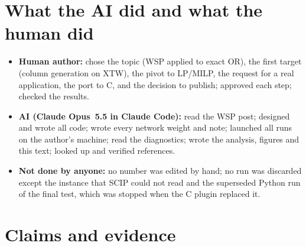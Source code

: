 \documentclass[11pt]{article}
\begin{document}
\section{What the AI did and what the human did}
\label{app:ai}
\begin{itemize}
\item \textbf{Human author:} chose the topic (WSP applied to exact OR), the first target (column
generation on XTW), the pivot to LP/MILP, the request for a real application, the port to C, and
the decision to publish; approved each step; checked the results.
\item \textbf{AI (Claude Opus~5.5 in Claude Code):} read the WSP post; designed and wrote all code;
wrote every network weight and note; launched all runs on the author's machine; read the
diagnostics; wrote the analysis, figures and this text; looked up and verified references.
\item \textbf{Not done by anyone:} no number was edited by hand; no run was discarded except the
instance that SCIP could not read and the superseded Python run of the final test, which was
stopped when the C plugin replaced it.
\end{itemize}

\section{Claims and evidence}
\label{app:claims}
\begin{center}\small
{}
\end{center}
\end{document}

